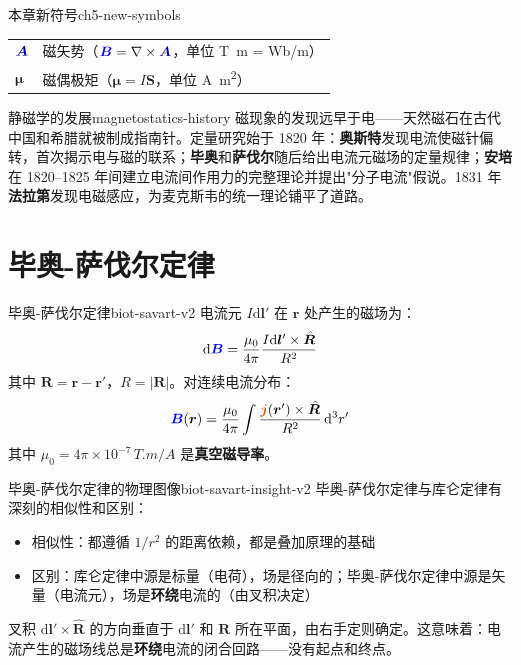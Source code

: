 \documentclass[11pt,a4paper,openany,oneside]{book}
\newcommand{\diff}{\mathrm{d}}
\newcommand{\vecB}{\textcolor{blue}{\vect{B}}}
\newcommand{\vecJ}{\textcolor{cororange}{\vect{j}}}
\newcommand{\vecA}{\textcolor{blue!70!black}{\vect{A}}}
\newcommand{\muz}{\mu_0}
\newcommand{\vect}[1]{\bm{#1}}
\newcommand{\unitvec}[1]{\hat{\vect{#1}}}
\newcommand{\curl}{\nabla\times}
\begin{document}
\begin{tip}{本章新符号}{ch5-new-symbols}
\begin{tabular}{@{}ll@{}}
$\vecA$ & 磁矢势（$\vecB = \curl\vecA$，单位 \si{T.m} = \si{Wb/m}） \\
$\vect{\mu}$ & 磁偶极矩（$\vect{\mu} = I\vect{S}$，单位 \si{A.m^2}） \\
\end{tabular}
\end{tip}

\begin{history}{静磁学的发展}{magnetostatics-history}
磁现象的发现远早于电——天然磁石在古代中国和希腊就被制成指南针。定量研究始于 1820 年：\textbf{奥斯特}发现电流使磁针偏转，首次揭示电与磁的联系；\textbf{毕奥}和\textbf{萨伐尔}随后给出电流元磁场的定量规律；\textbf{安培}在 1820--1825 年间建立电流间作用力的完整理论并提出"分子电流"假说。1831 年\textbf{法拉第}发现电磁感应，为麦克斯韦的统一理论铺平了道路。
\end{history}

\section{毕奥-萨伐尔定律}

\begin{theorem}{毕奥-萨伐尔定律}{biot-savart-v2}
电流元 $I\diff\vect{l}'$ 在 $\vect{r}$ 处产生的磁场为：
\[
\diff\vecB = \frac{\muz}{4\pi} \frac{I\diff\vect{l}' \times \unitvec{R}}{R^2}
\]
其中 $\vect{R} = \vect{r} - \vect{r}'$，$R = |\vect{R}|$。对连续电流分布：
\[
\vecB(\vect{r}) = \frac{\muz}{4\pi} \int \frac{\vecJ(\vect{r}') \times \unitvec{R}}{R^2} \, \diff^3r'
\]
其中 $\muz = 4\pi \times 10^{-7} \, \si{T.m/A}$ 是\textbf{真空磁导率}。
\end{theorem}

\begin{insight}{毕奥-萨伐尔定律的物理图像}{biot-savart-insight-v2}
毕奥-萨伐尔定律与库仑定律有深刻的相似性和区别：
\begin{itemize}
\item 相似性：都遵循 $1/r^2$ 的距离依赖，都是叠加原理的基础
\item 区别：库仑定律中源是标量（电荷），场是径向的；毕奥-萨伐尔定律中源是矢量（电流元），场是\textbf{环绕}电流的（由叉积决定）
\end{itemize}

叉积 $\diff\vect{l}' \times \unitvec{R}$ 的方向垂直于 $\diff\vect{l}'$ 和 $\vect{R}$ 所在平面，由右手定则确定。这意味着：电流产生的磁场线总是\textbf{环绕}电流的闭合回路——没有起点和终点。
\end{insight}
\end{document}
